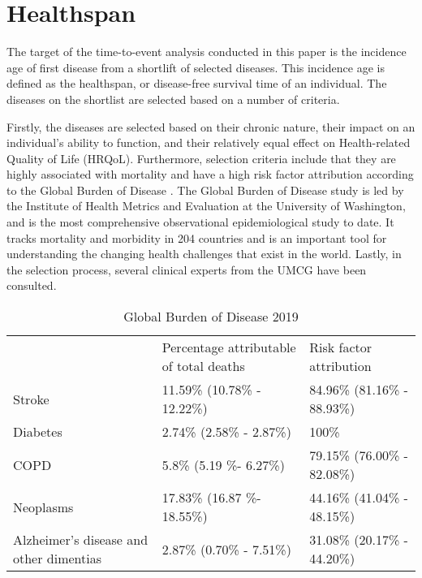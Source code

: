 \section{Healthspan}
\label{section:data:healthspan_target} %
The target of the time-to-event analysis conducted in this paper is the incidence age of first disease from a shortlift of selected diseases. This incidence age is defined as the healthspan, or disease-free survival time of an individual. The diseases on the shortlist are selected based on a number of criteria. 

Firstly, the diseases are selected based on their chronic nature, their impact on an individual's ability to function, and their relatively equal effect on Health-related Quality of Life (HRQoL). Furthermore, selection criteria include that they are highly associated with mortality and have a high risk factor attribution according to the Global Burden of Disease \citep{GBD}. The Global Burden of Disease study is led by the Institute of Health Metrics and Evaluation at the University of Washington, and is the most comprehensive observational epidemiological study to date. It tracks mortality and morbidity in 204 countries and is an important tool for understanding the changing health challenges that exist in the world.
Lastly, in the selection process, several clinical experts from the UMCG have been consulted. 
\vspace{0.5cm}
\begin{table}[H]
    \centering
    \caption{Global Burden of Disease 2019}
    \begin{tabular}{lll}
    \cline{1-3}
             & Percentage attributable of total deaths & Risk factor attribution     \\ \cline{1-3}
    Stroke   & 11.59\% (10.78\% - 12.22\%)             & 84.96\% (81.16\% - 88.93\%) \\
    Diabetes & 2.74\% (2.58\% - 2.87\%)                & 100\%                       \\
    COPD     & 5.8\% (5.19 \%- 6.27\%)                 & 79.15\% (76.00\% - 82.08\%) \\
    Neoplasms     & 17.83\% (16.87 \%- 18.55\%)                 & 44.16\% (41.04\% - 48.15\%) \\
    Alzheimer's disease and other dimentias & 2.87\% (0.70\% - 7.51\%)               & 31.08\% (20.17\% - 44.20\%) 
    \end{tabular}
    \label{table:data:global_burden_of_disease}
\end{table}
